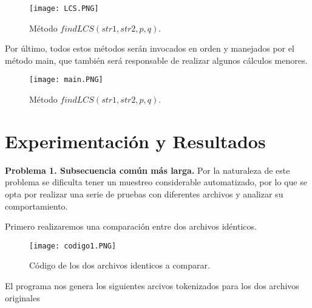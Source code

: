 \documentclass[12pt,twoside]{article}
\begin{document}
\vspace{0cm}

\begin{figure}[htb]
\centering
\texttt{[image: LCS.PNG]}
\caption{M\'etodo $findLCS(str1, str2, p, q)$.}
\end{figure}

\vspace{0cm}

Por \'ultimo, todos estos m\'etodos ser\'an invocados en orden y manejados por el m\'etodo main, que tambi\'en ser\'a responsable de realizar algunos c\'alculos menores.

\vspace{0cm}

\begin{figure}[htb]
\centering
\texttt{[image: main.PNG]}
\caption{M\'etodo $findLCS(str1, str2, p, q)$.}
\end{figure}

\vspace{0cm}

\newpage

\section{Experimentaci\'on y Resultados}
\textbf{Problema 1. Subsecuencia com\'un m\'as larga.}
Por la naturaleza de este problema se dificulta tener un muestreo considerable automatizado, por lo que se opta por realizar una serie de pruebas con diferentes archivos y analizar su comportamiento. 
\vspace{5mm} %

Primero realizaremos una comparación entre dos archivos id\'enticos.

\vspace{0cm}

\begin{figure}[htb]
\centering
\texttt{[image: codigo1.PNG]}
\caption{C\'odigo de los dos archivos identicos a comparar.}
\end{figure}

\vspace{0cm}

\vspace{5mm} %

El programa nos genera los siguientes arcivos tokenizados para los dos archivos originales

\vspace{5mm} %
\end{document}
